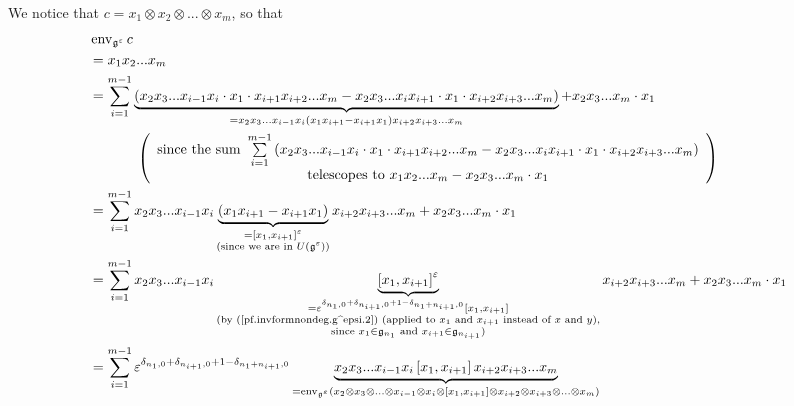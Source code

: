 \documentclass
[numbers=enddot,12pt,final,onecolumn,german,notitlepage]{scrartcl}%
\theoremstyle{definition}
\begin{document}
We notice that $c=x_{1}\otimes x_{2}\otimes...\otimes x_{m}$, so that%
\begin{align}
&  \operatorname*{env}\nolimits_{\mathfrak{g}^{\varepsilon}}c\nonumber\\
&  =x_{1}x_{2}...x_{m}\nonumber\\
&  =\sum\limits_{i=1}^{m-1}\underbrace{\left(  x_{2}x_{3}...x_{i-1}x_{i}\cdot
x_{1}\cdot x_{i+1}x_{i+2}...x_{m}-x_{2}x_{3}...x_{i}x_{i+1}\cdot x_{1}\cdot
x_{i+2}x_{i+3}...x_{m}\right)  }_{=x_{2}x_{3}...x_{i-1}x_{i}\left(
x_{1}x_{i+1}-x_{i+1}x_{1}\right)  x_{i+2}x_{i+3}...x_{m}}+x_{2}x_{3}%
...x_{m}\cdot x_{1}\nonumber\\
&  \ \ \ \ \ \ \ \ \ \ \left(
\begin{array}
[c]{c}%
\text{since the sum }\sum\limits_{i=1}^{m-1}\left(  x_{2}x_{3}...x_{i-1}%
x_{i}\cdot x_{1}\cdot x_{i+1}x_{i+2}...x_{m}-x_{2}x_{3}...x_{i}x_{i+1}\cdot
x_{1}\cdot x_{i+2}x_{i+3}...x_{m}\right) \\
\text{telescopes to }x_{1}x_{2}...x_{m}-x_{2}x_{3}...x_{m}\cdot x_{1}%
\end{array}
\right) \nonumber\\
&  =\sum\limits_{i=1}^{m-1}x_{2}x_{3}...x_{i-1}x_{i}\underbrace{\left(
x_{1}x_{i+1}-x_{i+1}x_{1}\right)  }_{\substack{=\left[  x_{1},x_{i+1}\right]
^{\varepsilon}\\\text{(since we are in }U\left(  \mathfrak{g}^{\varepsilon
}\right)  \text{)}}}x_{i+2}x_{i+3}...x_{m}+x_{2}x_{3}...x_{m}\cdot
x_{1}\nonumber\\
&  =\sum\limits_{i=1}^{m-1}x_{2}x_{3}...x_{i-1}x_{i}\underbrace{\left[
x_{1},x_{i+1}\right]  ^{\varepsilon}}_{\substack{=\varepsilon^{\delta
_{n_{1},0}+\delta_{n_{i+1},0}+1-\delta_{n_{1}+n_{i+1},0}}\left[  x_{1}%
,x_{i+1}\right]  \\\text{(by (\ref{pf.invformnondeg.g^epsi.2}) (applied to
}x_{1}\text{ and }x_{i+1}\text{ instead of }x\text{ and }y\text{),}%
\\\text{since }x_{1}\in\mathfrak{g}_{n_{1}}\text{ and }x_{i+1}\in
\mathfrak{g}_{n_{i+1}}\text{)}}}x_{i+2}x_{i+3}...x_{m}+x_{2}x_{3}...x_{m}\cdot
x_{1}\nonumber\\
&  =\sum\limits_{i=1}^{m-1}\varepsilon^{\delta_{n_{1},0}+\delta_{n_{i+1}%
,0}+1-\delta_{n_{1}+n_{i+1},0}}\underbrace{x_{2}x_{3}...x_{i-1}x_{i}\left[
x_{1},x_{i+1}\right]  x_{i+2}x_{i+3}...x_{m}}_{=\operatorname*{env}%
\nolimits_{\mathfrak{g}^{\varepsilon}}\left(  x_{2}\otimes x_{3}%
\otimes...\otimes x_{i-1}\otimes x_{i}\otimes\left[  x_{1},x_{i+1}\right]
\otimes x_{i+2}\otimes x_{i+3}\otimes...\otimes x_{m}\right)  }\nonumber\\

\end{align}
\end{document}
